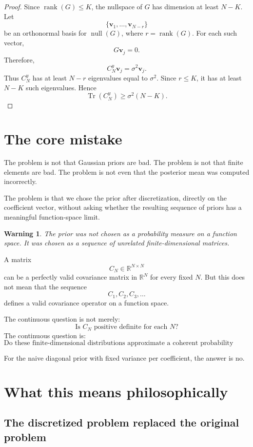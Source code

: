 \documentclass[11pt,a4paper]{book}
\newtheorem{warning}[definition]{Warning}
\begin{document}
\begin{proof}
Since $\operatorname{rank}(G)\leq K$, the nullspace of $G$ has dimension at
least $N-K$. Let
\[
    \{\bm{v}_1,\ldots,\bm{v}_{N-r}\}
\]
be an orthonormal basis for $\operatorname{null}(G)$, where
$r=\operatorname{rank}(G)$. For each such vector,
\[
    G\bm{v}_j = 0.
\]
Therefore,
\[
    C_N^y\bm{v}_j
    =
    \sigma^2\bm{v}_j.
\]
Thus $C_N^y$ has at least $N-r$ eigenvalues equal to $\sigma^2$. Since
$r\leq K$, it has at least $N-K$ such eigenvalues. Hence
\[
    \operatorname{Tr}(C_N^y)
    \geq
    \sigma^2(N-K).
\]
\end{proof}

\section{The core mistake}

The problem is not that Gaussian priors are bad. The problem is not that finite
elements are bad. The problem is not even that the posterior mean was computed
incorrectly.

The problem is that we chose the prior after discretization, directly on the
coefficient vector, without asking whether the resulting sequence of priors has
a meaningful function-space limit.

\begin{warning}
The prior was not chosen as a probability measure on a function space.
It was chosen as a sequence of unrelated finite-dimensional matrices.
\end{warning}

A matrix
\[
    C_N \in \mathbb{R}^{N\times N}
\]
can be a perfectly valid covariance matrix in $\mathbb{R}^N$ for every fixed
$N$. But this does not mean that the sequence
\[
    C_1,C_2,C_3,\ldots
\]
defines a valid covariance operator on a function space.

The continuous question is not merely:
\[
    \text{Is } C_N \text{ positive definite for each } N?
\]
The continuous question is:
\[
    \text{Do these finite-dimensional distributions approximate a coherent
    probability measure on functions?}
\]

For the naive diagonal prior with fixed variance per coefficient, the answer is
no.

\section{What this means philosophically}

\subsection{The discretized problem replaced the original problem}
\end{document}
